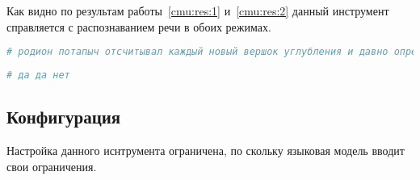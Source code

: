 Как видно по результам работы~\ref{cmu:res:1} и~\ref{cmu:res:2} данный инструмент
справляется с распознаванием речи в обоих режимах.


\begin{lstlisting}[caption={Результат запуска 1 версии},label={cmu:res:1}, language=bash]
# родион потапыч отсчитывал каждый новый вершок углубления и давно определил про себя
\end{lstlisting}

\begin{lstlisting}[caption={Результат запуска 2 версии},label={cmu:res:2},language=bash]
# да да нет
\end{lstlisting}
\subsection{Конфигурация}

Настройка данного иснтрумента ограничена, по скольку языковая модель вводит свои
ограничения.
